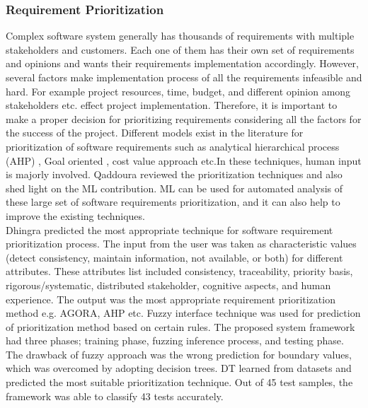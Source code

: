 \subsubsection{Requirement Prioritization}
Complex software system generally has thousands of requirements with multiple
stakeholders and customers. Each one of them has their own set of requirements
and opinions and wants their requirements implementation accordingly. However,
several factors make implementation process of all the requirements infeasible
and hard. For example project resources, time, budget, and different opinion among
stakeholders etc. effect project implementation. Therefore, it
is important to make a proper decision for prioritizing requirements considering
all the factors for the success of the project. Different models exist in the
literature for prioritization of software requirements such as analytical
hierarchical process (AHP) \cite{saaty2008}, Goal oriented
\cite{VanLamsweerde:2001}, cost value approach \cite{Karlsson:1997} etc.In these
techniques, human input is majorly involved. Qaddoura \etal \cite{RQaddoura}
reviewed the prioritization techniques and also shed light on the ML
contribution. ML can be used for automated analysis of these large set of
software requirements prioritization, and it can also help to improve the existing techniques.\\

	Dhingra \etal  \cite{S.Dhingra} predicted the most appropriate technique for
software requirement prioritization process. The input from the user was taken as characteristic values (detect consistency, maintain information, not available, or both) for different attributes. These attributes list included consistency,
traceability, priority basis, rigorous/systematic, distributed stakeholder,
cognitive aspects, and human experience. The output was the
most appropriate requirement prioritization method e.g. AGORA, AHP etc. Fuzzy interface technique was
used for prediction of prioritization method based on certain rules. The
proposed system framework had three phases; training phase, fuzzing inference
process, and testing phase. The drawback of fuzzy approach was the wrong prediction
for boundary values, which was overcomed by adopting decision trees. DT learned from datasets and
predicted the most suitable prioritization technique. Out of 45 test samples, the
framework was able to classify 43 tests accurately.\\

